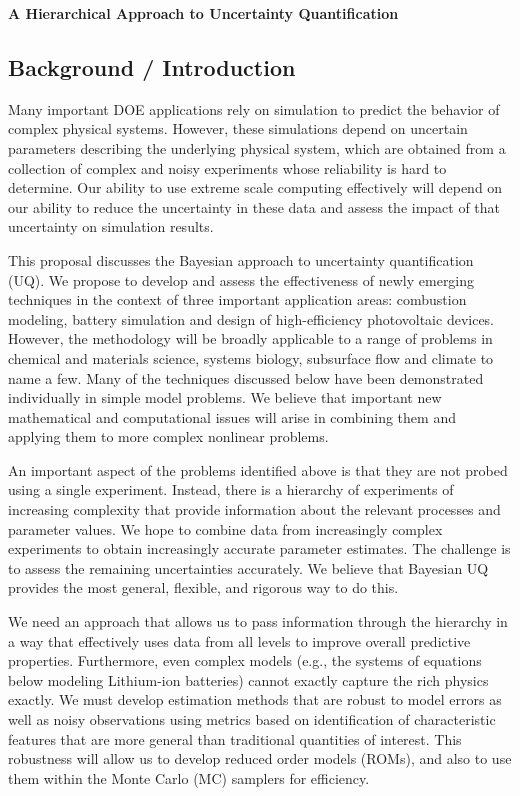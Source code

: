 \documentclass[11pt]{article}
\begin{document}
\begin{center}
{\large{\textbf{A Hierarchical Approach to Uncertainty Quantification}}}
\end{center}

\subsection*{Background / Introduction}

Many important DOE applications rely on simulation to predict the behavior of complex physical systems.
However, these simulations depend on uncertain parameters describing the underlying physical system,
which are obtained from a collection of
complex and noisy experiments whose reliability is hard to determine. 
Our ability to use extreme scale computing effectively will depend on our ability to reduce the
uncertainty in these data and assess the impact of that uncertainty on simulation results.

This proposal discusses the Bayesian approach to uncertainty quantification (UQ).
We propose to develop and assess the effectiveness of newly emerging techniques in the 
context of three important application areas: combustion modeling, 
battery simulation and design of high-efficiency photovoltaic devices.
However, the methodology will be broadly applicable to a
range of problems in chemical and materials science, systems biology, subsurface flow and climate 
to name a few.
Many of the techniques discussed below have been demonstrated individually in simple model problems.
We believe that important new mathematical and computational issues will arise in combining them 
and applying them to more complex nonlinear problems.

An important aspect of the problems identified above is that they are not probed using a 
single experiment.  
Instead, there is a hierarchy of experiments of increasing complexity that provide 
information about the relevant processes and parameter values.
We hope to combine data from increasingly complex experiments to obtain increasingly accurate
parameter estimates.
The challenge is to assess the remaining uncertainties accurately.
We believe that Bayesian UQ provides the most general, flexible, and rigorous way to do this.

We need an approach that allows us to pass information through the hierarchy in a way that 
effectively uses data from all levels to improve overall predictive properties.
Furthermore, even complex models (e.g., the systems of equations below modeling Lithium-ion batteries)
cannot exactly capture the rich physics exactly.
We must develop estimation methods that are robust to model errors as well as noisy observations
using metrics based on identification of characteristic features that are more general than
traditional quantities of interest.
This robustness will allow us to develop reduced order models (ROMs), and also to use them 
within the Monte Carlo (MC) samplers for efficiency. 
\end{document}
